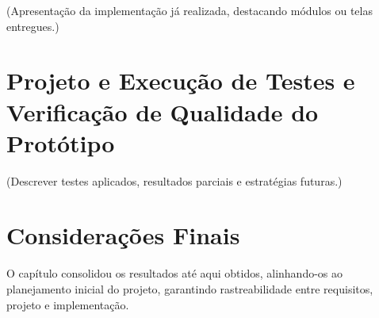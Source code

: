 (Apresentação da implementação já realizada, destacando módulos ou telas entregues.)

\section{Projeto e Execução de Testes e Verificação de Qualidade do Protótipo}

(Descrever testes aplicados, resultados parciais e estratégias futuras.)

\section*{Considerações Finais}

O capítulo consolidou os resultados até aqui obtidos, alinhando-os ao planejamento inicial do projeto, garantindo rastreabilidade entre requisitos, projeto e implementação.
